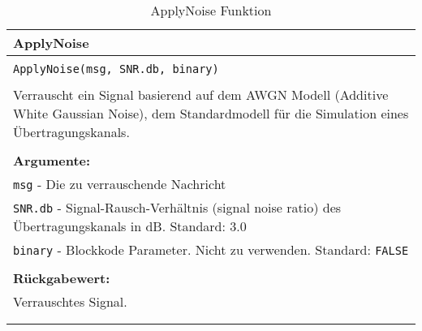 \begin{longtable}{|p{\textwidth}|}
\hline
\rowcolor{lightblue}
ApplyNoise
\\
\hline
\\
\texttt{ApplyNoise(msg, SNR.db, binary)}\\
\\
Verrauscht ein Signal basierend auf dem AWGN Modell (Additive White Gaussian Noise), dem Standardmodell für die Simulation eines Übertragungskanals.\\
\\
\textbf{Argumente:}\\
\texttt{msg} - Die zu verrauschende Nachricht\\
\texttt{SNR.db} - Signal-Rausch-Verhältnis (signal noise ratio) des Übertragungskanals in dB. Standard: 3.0\\
\texttt{binary} - Blockkode Parameter. Nicht zu verwenden. Standard: \texttt{FALSE}\\
\\
\textbf{Rückgabewert:}\\
Verrauschtes Signal.\\
\\
\hline
\caption{ApplyNoise Funktion}
\end{longtable}